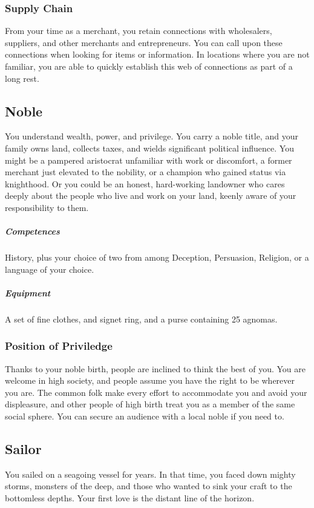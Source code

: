     \subsubsection{Supply Chain} \label{feat::supplychain}
        From your time as a merchant, you retain connections with wholesalers, suppliers, and other merchants and entrepreneurs.
        You can call upon these connections when looking for items or information.
        In locations where you are not familiar, you are able to quickly establish this web of connections as part of a long rest.

\subsection*{Noble} \label{ssec::noble}
    You understand wealth, power, and privilege.
    You carry a noble title, and your family owns land, collects taxes, and wields significant political influence.
    You might be a pampered aristocrat unfamiliar with work or discomfort, a former merchant just elevated to the nobility, or a champion who gained status via knighthood.
    Or you could be an honest, hard-working landowner who cares deeply about the people who live and work on your land, keenly aware of your responsibility to them.
    \subparagraph{Competences} History, plus your choice of two from among Deception, Persuasion, Religion, or a language of your choice.
    \subparagraph{Equipment} A set of fine clothes, and signet ring, and a purse containing 25 agnomas.
    \subsubsection{Position of Priviledge}
        Thanks to your noble birth, people are inclined to think the best of you.
        You are welcome in high society, and people assume you have the right to be wherever you are.
        The common folk make every effort to accommodate you and avoid your displeasure, and other people of high birth treat you as a member of the same social sphere.
        You can secure an audience with a local noble if you need to.

\subsection*{Sailor} \label{ssec::sailor}
    You sailed on a seagoing vessel for years.
    In that time, you faced down mighty storms, monsters of the deep, and those who wanted to sink your craft to the bottomless depths.
    Your first love is the distant line of the horizon.

